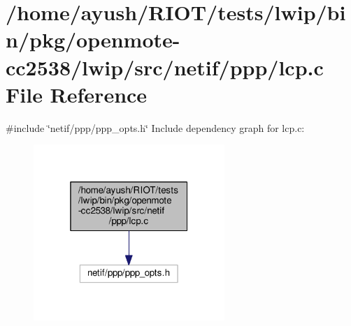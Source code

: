 \hypertarget{openmote-cc2538_2lwip_2src_2netif_2ppp_2lcp_8c}{}\section{/home/ayush/\+R\+I\+O\+T/tests/lwip/bin/pkg/openmote-\/cc2538/lwip/src/netif/ppp/lcp.c File Reference}
\label{openmote-cc2538_2lwip_2src_2netif_2ppp_2lcp_8c}
{\ttfamily \#include \char`\"{}netif/ppp/ppp\+\_\+opts.\+h\char`\"{}}\newline
Include dependency graph for lcp.\+c\+:
\nopagebreak
\begin{figure}[H]
\begin{center}
\leavevmode
\includegraphics[width=205pt]{openmote-cc2538_2lwip_2src_2netif_2ppp_2lcp_8c__incl}
\end{center}
\end{figure}
